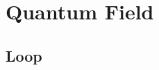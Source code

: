 \documentclass{tufte-book} %
\newcommand{\doccls}[1]{\texttt{#1}}
\newcommand{\VDQI}{\textit{The Visual Display of Quantitative Information}\xspace}
\newcommand{\EI}{\textit{Envisioning Information}\xspace}
\newcommand{\VE}{\textit{Visual Explanations}\xspace}
\newcommand{\BE}{\textit{Beautiful Evidence}\xspace}
\begin{document}


\mainmatter



\chapter{Quantum Field}
\label{ch:quantum_field}
\section{Loop}



\end{document}
